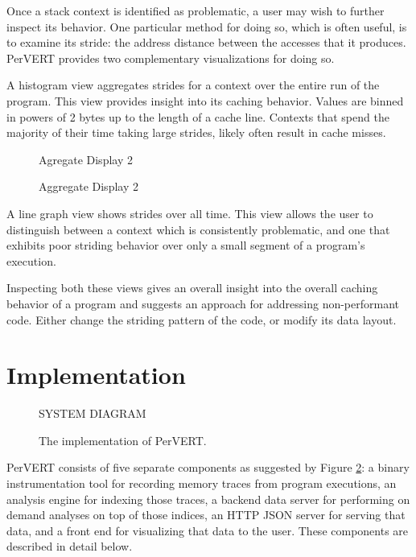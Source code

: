 \documentclass[annual]{acmsiggraph}
\begin{document}
    Once a stack context is identified as problematic, a user may wish to further inspect its behavior.
    One particular method for doing so, which is often useful, is to examine its stride:
      the address distance between the accesses that it produces.
    PerVERT provides two complementary visualizations for doing so.

    A histogram view aggregates strides for a context over the entire run of the program.
    This view provides insight into its caching behavior.
    Values are binned in powers of 2 bytes up to the length of a cache line.
    Contexts that spend the majority of their time taking large strides, likely often result in cache misses.
    
    \begin{figure}[t]
  		\centering
      Agregate Display 2
  		\caption{Aggregate Display 2}
      \label{fig:system}
  	\end{figure}

    
    A line graph view shows strides over all time.
    This view allows the user to distinguish between a context which is consistently problematic, 
      and one that exhibits poor striding behavior over only a small segment of a program's execution.

    Inspecting both these views gives an overall insight into the overall caching behavior of a program 
      and suggests an approach for addressing non-performant code.
    Either change the striding pattern of the code, or modify its data layout.

\section{Implementation}\label{ch_i}

	\begin{figure}[t]
		\centering
    SYSTEM DIAGRAM
		\caption{The implementation of PerVERT.}
    \label{fig:system}
	\end{figure}

  PerVERT consists of five separate components as suggested by Figure \ref{fig:system}:
    a binary instrumentation tool for recording memory traces from program executions,
    an analysis engine for indexing those traces,
    a backend data server for performing on demand analyses on top of those indices,
    an HTTP JSON server for serving that data,
    and a front end for visualizing that data to the user.
  These components are described in detail below.  
\end{document}
